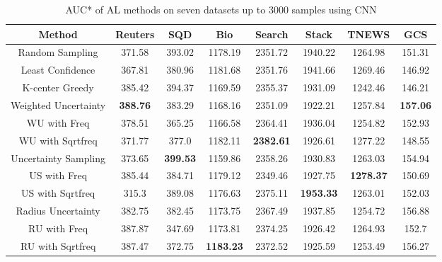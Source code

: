 \begin{table}[th]
	\centering
	\scriptsize
	\begin{tabular}{cccccccc}
		\toprule
		Method & Reuters & SQD & Bio & Search & Stack & TNEWS & GCS \\ \hline
		Random Sampling & 371.58  & 393.02 & 1178.19 & 2351.72 & 1940.22 & 1264.98 & 151.31  \\
		Least Confidence & 367.81 & 380.96  & 1181.68 & 2351.76 & 1941.66 & 1269.46 & 146.92 \\
		K-center Greedy & 385.42 & 394.37  & 1169.59  & 2355.37 & 1931.09 & 1242.46 & 146.21 \\ \hline
		Weighted Uncertainty & \textbf{388.76} & 383.29 & 1168.16 & 2351.09 & 1922.21 & 1257.84 & \textbf{157.06 }  \\
		WU with Freq & 378.51 & 365.25  & 1166.58 & 2364.41 & 1936.04 & 1254.82 & 152.93  \\
		WU with Sqrtfreq & 371.77 & 377.0 & 1182.11 & \textbf{2382.61} & 1926.61 & 1277.22 & 148.55  \\ \hline
		Uncertainty Sampling & 373.65 & \textbf{399.53} & 1159.86 & 2358.26  & 1930.83 & 1263.03 & 154.94 \\
		US with Freq & 385.44 & 384.71 & 1179.12  & 2349.46 & 1927.75 & \textbf{1278.37} & 150.69  \\
		US with Sqrtfreq & 315.3 & 389.08 & 1176.63 & 2375.11 & \textbf{1953.33} & 1263.01 & 152.03 \\ \hline
		Radius Uncertainty & 382.75 & 382.45 & 1173.75 & 2367.49 & 1937.85 & 1254.72 & 156.88   \\
		RU with Freq & 387.87 & 347.69 & 1173.81 & 2374.25 & 1926.42 & 1264.93 &  152.7 \\
		RU with Sqrtfreq & 387.47 & 372.75 & \textbf{1183.23} & 2372.52 &  1925.59 & 1253.49 & 156.27 \\
		\hline
	\end{tabular}
\caption{AUC* of AL methods on seven datasets up to 3000 samples using CNN}
\label{table:auc_cnn}
\end{table}

